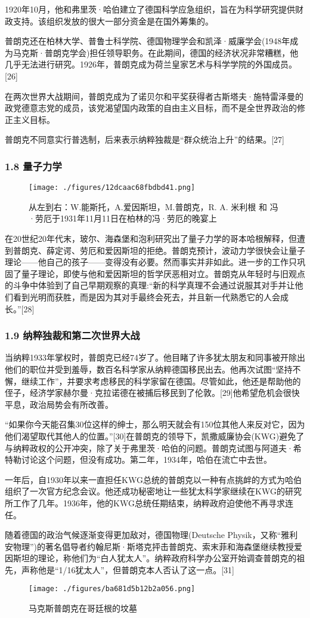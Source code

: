 1920年10月，他和弗里茨·哈伯建立了德国科学应急组织，旨在为科学研究提供财政支持。该组织发放的很大一部分资金是在国外筹集的。

普朗克还在柏林大学、普鲁士科学院、德国物理学会和凯泽·威廉学会(1948年成为马克斯·普朗克学会)担任领导职务。在此期间，德国的经济状况非常糟糕，他几乎无法进行研究。1926年，普朗克成为荷兰皇家艺术与科学学院的外国成员。[26]

在两次世界大战期间，普朗克成为了诺贝尔和平奖获得者古斯塔夫·施特雷泽曼的政党德意志党的成员，该党渴望国内政策的自由主义目标，而不是全世界政治的修正主义目标。

普朗克不同意实行普选制，后来表示纳粹独裁是“群众统治上升”的结果。[27]

\subsubsection{1.8 量子力学}
\begin{figure}[ht]
\centering
\texttt{[image: ./figures/12dcaac68fbdbd41.png]}
\caption{从左到右：W.能斯托，A.爱因斯坦，M.普朗克，R. A. 米利根 和 冯·劳厄于1931年11月11日在柏林的冯·劳厄的晚宴上} \label{fig_Max_5}
\end{figure}
在20世纪20年代末，玻尔、海森堡和泡利研究出了量子力学的哥本哈根解释，但遭到普朗克、薛定谔、劳厄和爱因斯坦的拒绝。普朗克预计，波动力学很快会让量子理论——他自己的孩子——变得没有必要。然而事实并非如此。进一步的工作只巩固了量子理论，即使与他和爱因斯坦的哲学厌恶相对立。普朗克从年轻时与旧观点的斗争中体验到了自己早期观察的真理:“新的科学真理不会通过说服其对手并让他们看到光明而获胜，而是因为其对手最终会死去，并且新一代熟悉它的人会成长。”[28]

\subsubsection{1.9 纳粹独裁和第二次世界大战}
当纳粹1933年掌权时，普朗克已经74岁了。他目睹了许多犹太朋友和同事被开除出他们的职位并受到羞辱，数百名科学家从纳粹德国移民出去。他再次试图“坚持不懈，继续工作”，并要求考虑移民的科学家留在德国。尽管如此，他还是帮助他的侄子，经济学家赫尔曼·克拉诺德在被捕后移民到了伦敦。[29]他希望危机会很快平息，政治局势会有所改善。

“如果你今天能召集30位这样的绅士，那么明天就会有150位其他人来反对它，因为他们渴望取代其他人的位置。”[30]在普朗克的领导下，凯撒威廉协会(KWG)避免了与纳粹政权的公开冲突，除了关于弗里茨·哈伯的问题。普朗克试图与阿道夫·希特勒讨论这个问题，但没有成功。第二年，1934年，哈伯在流亡中去世。

一年后，自1930年以来一直担任KWG总统的普朗克以一种有点挑衅的方式为哈伯组织了一次官方纪念会议。他还成功秘密地让一些犹太科学家继续在KWG的研究所工作了几年。1936年，他的KWG总统任期结束，纳粹政府迫使他不再寻求连任。

随着德国的政治气候逐渐变得更加敌对，德国物理(Deutsche Physik，又称“雅利安物理”)的著名倡导者约翰尼斯·斯塔克抨击普朗克、索末菲和海森堡继续教授爱因斯坦的理论，称他们为“白人犹太人”。纳粹政府科学办公室开始调查普朗克的祖先，声称他是“1/16犹太人”，但普朗克本人否认了这一点。[31]
\begin{figure}[ht]
\centering
\texttt{[image: ./figures/ba681d5b12b2a056.png]}
\caption{马克斯普朗克在哥廷根的坟墓} \label{fig_Max_6}
\end{figure}
